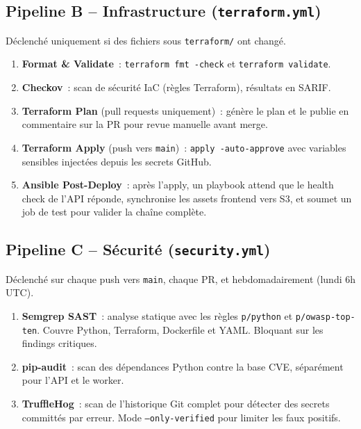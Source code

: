 \documentclass[11pt,a4paper]{article}
\newcommand{\code}[1]{\texttt{#1}}
\begin{document}
\subsection{Pipeline B -- Infrastructure (\code{terraform.yml})}

D\'{e}clench\'{e} uniquement si des fichiers sous \code{terraform/} ont chang\'{e}.

\begin{enumerate}[noitemsep]
  \item \textbf{Format \& Validate}~: \code{terraform fmt -check} et \code{terraform validate}.
  \item \textbf{Checkov}~: scan de s\'{e}curit\'{e} IaC (r\`{e}gles Terraform), r\'{e}sultats en SARIF.
  \item \textbf{Terraform Plan} (pull requests uniquement)~: g\'{e}n\`{e}re le plan et le publie en commentaire sur la PR pour revue manuelle avant merge.
  \item \textbf{Terraform Apply} (push vers \code{main})~: \code{apply -auto-approve} avec variables sensibles inject\'{e}es depuis les secrets GitHub.
  \item \textbf{Ansible Post-Deploy}~: apr\`{e}s l'apply, un playbook attend que le health check de l'API r\'{e}ponde, synchronise les assets frontend vers S3, et soumet un job de test pour valider la cha\^{i}ne compl\`{e}te.
\end{enumerate}

\subsection{Pipeline C -- S\'{e}curit\'{e} (\code{security.yml})}

D\'{e}clench\'{e} sur chaque push vers \code{main}, chaque PR, et hebdomadairement (lundi 6h UTC).

\begin{enumerate}[noitemsep]
  \item \textbf{Semgrep SAST}~: analyse statique avec les r\`{e}gles \code{p/python} et \code{p/owasp-top-ten}. Couvre Python, Terraform, Dockerfile et YAML. Bloquant sur les findings critiques.
  \item \textbf{pip-audit}~: scan des d\'{e}pendances Python contre la base CVE, s\'{e}par\'{e}ment pour l'API et le worker.
  \item \textbf{TruffleHog}~: scan de l'historique Git complet pour d\'{e}tecter des secrets committ\'{e}s par erreur. Mode \code{--only-verified} pour limiter les faux positifs.
\end{enumerate}
\end{document}
